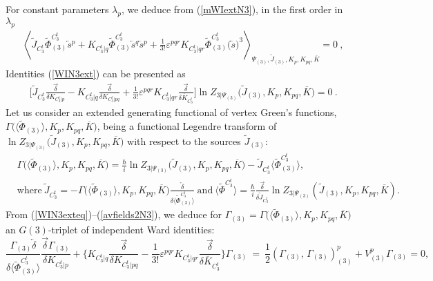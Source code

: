 \documentclass[10pt]{article}
\begin{document}
For constant parameters $\lambda_{p}$, we deduce from (\ref{mWIextN3}),
in the first order in $\lambda_{p}$
\begin{align}
&\left\langle \widetilde{J}_{C^t_3}\widetilde{\Phi}^{C^t_3}_{(3)} \overleftarrow{s}{}^p +  K_{C^t_3|q} \widetilde{\Phi}_{(3)}^{C^t_3} \overleftarrow{s}{}^q \overleftarrow{s}{}^p + \frac{1}{3!}\varepsilon^{pqr}K_{C^t_3|qr} \widetilde{\Phi}_{(3)}^{C^t_3} \big(\overleftarrow{s}\big)^3  \right\rangle _{\Psi_{(3)},\widetilde{ J}_{(3)},K_p, K_{pq}, \overline{K}} =0\ ,\label{WIN3ext}
\end{align}
Identities (\ref{WIN3ext}) can be presented as
\begin{align}
&   \Big[\widetilde{J}_{C^t_3}\frac{\overrightarrow{\delta}}
{\delta K_{C^t_3|p}} -
 K_{C^t_3|q}
\frac{\overrightarrow{\delta}}{\delta K_{C^t_3|pq}}+ \frac{1}{3!}
\varepsilon^{pqr} K_{C^t_3|qr}
\frac{\overrightarrow{\delta}}{ \delta \overline{K}_{C^t_3}} \Big]
\ln  Z_{3|\Psi_{(3)}}\big(\widetilde{J}_{(3)}, K_{p},  K_{pq}, \overline{K}\big)%
=0\ .\label{WIN3exteq}
\end{align}
Let us consider an extended generating functional of vertex Green's functions,
$\Gamma\big(\langle\widetilde{\Phi}_{(3)}\rangle, K_{p},  K_{pq}, \overline{K}\big)$, being a functional
Legendre transform of $\ln Z_{3|\Psi_{(3)}}\big(\widetilde{J}_{(3)}, K_{p},  K_{pq}, \overline{K}\big)$
with respect to the sources $\widetilde{J}_{(3)}$:%
\begin{align}
&  \Gamma\big(\langle\widetilde{\Phi}_{(3)}\rangle, K_{p},  K_{pq}, \overline{K}\big)=\frac{\hbar}{i}\ln
Z_{3|\Psi_{(3)}}\big(\widetilde{J}_{(3)}, K_{p},  K_{pq}, \overline{K}\big) -
\widetilde{J}_{C^t_3} \langle\widetilde{\Phi}^{C^t_3}_{(3)}\rangle ,\label{avfields1N3}\\
& \mathrm {where}\ \widetilde{J}_{C^t_3} = -\Gamma\big(\langle\widetilde{\Phi}_{(3)}\rangle, K_{p},  K_{pq}, \overline{K}\big)\frac{\overleftarrow{\delta}}{\delta\langle\widetilde{\Phi}_{(3)}^{C^t_3}\rangle} \ \mathrm{and } \ \langle\widetilde{\Phi}^{C^t_3}\rangle=\frac{\hbar}{i}\frac{\overrightarrow{\delta}}{\delta \widetilde{J}_{C^t_3}}\ln
Z_{3|\Psi_{(3)}}(\widetilde{J}_{(3)}, K_{p},  K_{pq}, \overline{K}).\label{avfields2N3}%
\end{align}
From (\ref{WIN3exteq})--(\ref{avfields2N3}), we deduce for
$\Gamma_{(3)}=\Gamma\big(\langle\widetilde{\Phi}_{(3)}\rangle, K_{p},  K_{pq}, \overline{K}\big)$
an $G(3)$-triplet of independent Ward identities:%
\begin{equation}
   \frac{\Gamma_{(3)} \overleftarrow{\delta}}{\delta\langle\widetilde{\Phi}_{(3)}^{C^t_3}\rangle} \frac{\overrightarrow{\delta}\Gamma_{(3)}}
{\delta K_{C^t_3|p}} +
 \Big\{ K_{C^t_3|q}
\frac{\overrightarrow{\delta}}{\delta K_{C^t_3|pq}}- \frac{1}{3!}
\varepsilon^{pqr} K_{C^t_3|qr}
\frac{\overrightarrow{\delta}}{ \delta \overline{K}_{C^t_3}}\Big\}\Gamma_{(3)}   \ = \  \frac{1}{2}\left(  \Gamma_{(3)}, \, \Gamma_{(3)}\right) _{(3)}^{p}+ V_{(3)}^{p}\Gamma_{(3)}=0,  \label{meq3}%
\end{equation}
\end{document}

